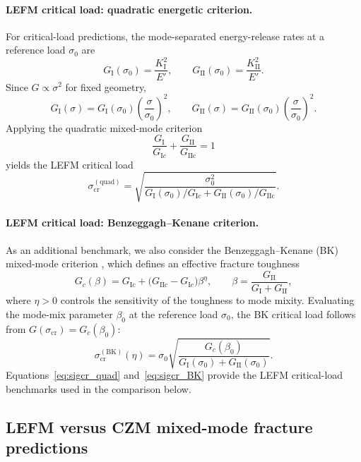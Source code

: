\documentclass[smallextended]{svjour3}       %
\begin{document}
\paragraph{LEFM critical load: quadratic energetic criterion.}
For critical-load predictions, the mode-separated energy-release rates at a
reference load \(\sigma_0\) are
\[
G_{\mathrm I}(\sigma_0)=\frac{K_{\mathrm I}^2}{E'},
\qquad
G_{\mathrm{II}}(\sigma_0)=\frac{K_{\mathrm{II}}^2}{E'}.
\]
Since \(G\propto\sigma^2\) for fixed geometry,
\[
G_{\mathrm I}(\sigma)
=
G_{\mathrm I}(\sigma_0)\left(\frac{\sigma}{\sigma_0}\right)^2,
\qquad
G_{\mathrm{II}}(\sigma)
=
G_{\mathrm{II}}(\sigma_0)\left(\frac{\sigma}{\sigma_0}\right)^2.
\]
Applying the quadratic mixed-mode criterion
\[
\frac{G_{\mathrm I}}{G_{\mathrm Ic}}
+
\frac{G_{\mathrm{II}}}{G_{\mathrm{IIc}}}
=1
\]
yields the LEFM critical load
\begin{equation}
	\sigma_{\mathrm{cr}}^{(\mathrm{quad})}
	=
	\sqrt{
		\frac{\sigma_0^2}{
			G_{\mathrm I}(\sigma_0)/G_{\mathrm Ic}
			+
			G_{\mathrm{II}}(\sigma_0)/G_{\mathrm{IIc}}
		}
	}.
	\label{eq:sigcr_quad}
\end{equation}

\paragraph{LEFM critical load: Benzeggagh--Kenane criterion.}
As an additional benchmark, we also consider the Benzeggagh--Kenane (BK)
mixed-mode criterion \cite{BenzeggaghKenane1996}, which defines an effective
fracture toughness
\begin{equation}
	G_c(\beta)
	=
	G_{\mathrm Ic}
	+
	\bigl(G_{\mathrm{IIc}}-G_{\mathrm Ic}\bigr)\beta^{\eta},
	\qquad
	\beta
	=
	\frac{G_{\mathrm{II}}}{G_{\mathrm I}+G_{\mathrm{II}}},
	\label{eq:BK}
\end{equation}
where \(\eta>0\) controls the sensitivity of the toughness to mode mixity.
Evaluating the mode-mix parameter \(\beta_0\) at the reference load
\(\sigma_0\), the BK critical load follows from
\(G(\sigma_{\mathrm{cr}})=G_c(\beta_0)\):
\begin{equation}
	\sigma_{\mathrm{cr}}^{(\mathrm{BK})}(\eta)
	=
	\sigma_0
	\sqrt{
		\frac{G_c(\beta_0)}
		{G_{\mathrm I}(\sigma_0)+G_{\mathrm{II}}(\sigma_0)}
	}.
	\label{eq:sigcr_BK}
\end{equation}
Equations~\eqref{eq:sigcr_quad} and~\eqref{eq:sigcr_BK} provide the LEFM
critical-load benchmarks used in the comparison below.

\subsection{LEFM versus CZM mixed-mode fracture predictions}
\end{document}
